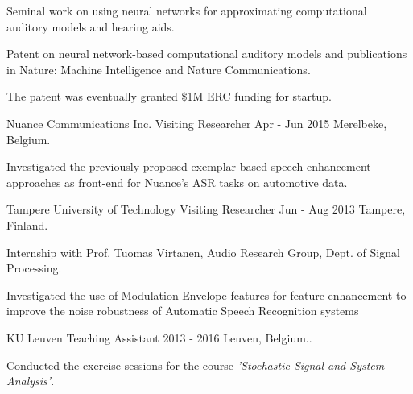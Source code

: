 \documentclass[]{awesome-cv}
\begin{document}
\begin{cventries}
{\begin{cvitems}
		\item {Seminal work on using neural networks for approximating computational auditory models and hearing aids.}
		\item {Patent on neural network-based computational auditory models and publications in Nature: Machine Intelligence and Nature Communications.}
		\item {The patent was eventually granted \$1M ERC funding for startup.}
		\end{cvitems}}
	\cventry
	{Nuance Communications Inc.}
	{Visiting Researcher}
	{Apr - Jun 2015}
	{Merelbeke, Belgium.}
	{\begin{cvitems}
		\item {Investigated the previously proposed exemplar-based speech enhancement approaches as front-end for Nuance's ASR tasks on automotive data.}
		\end{cvitems}}
	\cventry
	{Tampere University of Technology}
	{Visiting Researcher}
	{Jun - Aug 2013}
	{Tampere, Finland.}
	{\begin{cvitems}
		\item {Internship with Prof. Tuomas Virtanen, Audio Research Group, Dept. of Signal Processing.}
		\item {Investigated the use of Modulation Envelope features for feature enhancement to improve the noise robustness of Automatic Speech Recognition systems}
	\end{cvitems}}
	\cventry
	{KU Leuven}
	{Teaching Assistant}
	{2013 - 2016}
	{Leuven, Belgium..}
	{\begin{cvitems}
		\item {Conducted the exercise sessions for the course \emph{'Stochastic Signal and System Analysis'}.}
	\end{cvitems}}
\end{cventries}
\end{document}
